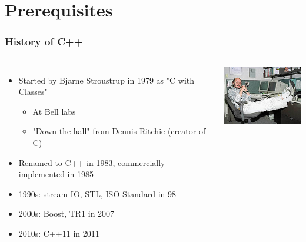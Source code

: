 \documentclass{beamer}
\begin{document}

\section{Prerequisites}
\frame{\sectionpage}

\begin{frame}
    \frametitle{History of C++}



    \begin{columns}[t]
        \column{7cm}
        \begin{itemize}
            \item<1->Started by Bjarne Stroustrup in 1979 as "C with Classes"
                \begin{itemize}
                    \item At Bell labs
                    \item "Down the hall" from Dennis Ritchie (creator of C)
                \end{itemize}
            \item<1->Renamed to C++ in 1983, commercially implemented in 1985
            \item<2->1990s: stream IO, STL, ISO Standard in 98
            \item<3->2000s: Boost, TR1 in 2007
            \item<4->2010s: C++11 in 2011
        \end{itemize}
        \column[T]{4cm}
        \includegraphics[width=4cm]{220px-BjarneStroustrup.jpg}
    \end{columns}


\end{frame}
\end{document}
